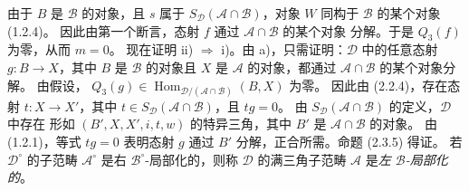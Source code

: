 \clearpage
{}%
\begingroup
\small
\setlength{\parskip}{0pt}%
\setlength{\emergencystretch}{1.5em}%

\noindent 由于 $B$ 是 $\mathcal B$ 的对象，且 $s$ 属于
$S_{\mathcal D}(\mathcal A\cap\mathcal B)$，对象 $W$ 同构于
$\mathcal B$ 的某个对象 (1.2.4)。
因此由第一个断言，态射 $f$ 通过 $\mathcal A\cap\mathcal B$ 的某个对象
分解。于是 $Q_3(f)$ 为零，从而 $m=0$。
现在证明 ii) $\Rightarrow$ i)。由 a)，只需证明：$\mathcal D$ 中的任意态射
$g\colon B\longrightarrow X$，其中 $B$ 是 $\mathcal B$ 的对象且 $X$ 是
$\mathcal A$ 的对象，都通过 $\mathcal A\cap\mathcal B$ 的某个对象分解。
由假设，
$Q_3(g)\in\operatorname{Hom}_{\mathcal D/(\mathcal A\cap\mathcal B)}(B,X)$
为零。
因此由 (2.2.4)，存在态射 $t\colon X\longrightarrow X'$，其中
$t\in S_{\mathcal D}(\mathcal A\cap\mathcal B)$，且 $tg=0$。
由 $S_{\mathcal D}(\mathcal A\cap\mathcal B)$ 的定义，$\mathcal D$ 中存在
形如 $(B',X,X',i,t,w)$ 的特异三角，其中 $B'$ 是
$\mathcal A\cap\mathcal B$ 的对象。
由 (1.2.1)，等式 $tg=0$ 表明态射 $g$ 通过 $B'$ 分解，正合所需。命题
(2.3.5) 得证。
\medskip
若 $\mathcal D^\circ$ 的子范畴 $\mathcal A^\circ$ 是右
$\mathcal B^\circ$-局部化的，则称 $\mathcal D$ 的满三角子范畴
$\mathcal A$ 是\emph{左 $\mathcal B$-局部化的}。
\endgroup
